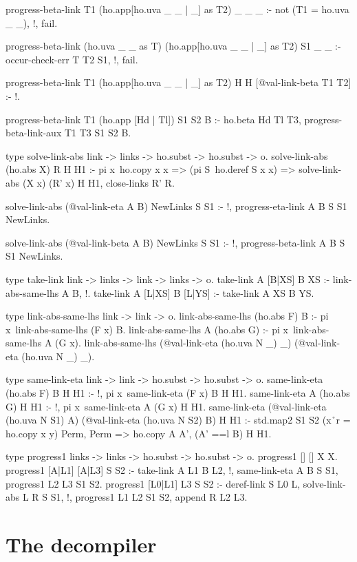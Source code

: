 \begin{elpicode}
  progress-beta-link T1 (ho.app[ho.uva _ _ | _] as T2) _ _ _ :- 
    not (T1 = ho.uva _ _), !, fail.

  progress-beta-link (ho.uva _ _ as T) (ho.app[ho.uva _ _ | _] as T2) S1 _ _ :- 
    occur-check-err T T2 S1, !, fail.

  progress-beta-link T1 (ho.app[ho.uva _ _ | _] as T2) H H [@val-link-beta T1 T2] :- !.

  progress-beta-link T1 (ho.app [Hd | Tl]) S1 S2 B :-
    ho.beta Hd Tl T3, 
    progress-beta-link-aux T1 T3 S1 S2 B.

  type solve-link-abs link -> links -> ho.subst -> ho.subst -> o.
  solve-link-abs (ho.abs X) R H H1 :- 
    pi x\ ho.copy x x => (pi S\ ho.deref S x x) => 
      solve-link-abs (X x) (R' x) H H1,
    close-links R' R.

  solve-link-abs (@val-link-eta A B) NewLinks S S1 :- !,
    progress-eta-link A B S S1 NewLinks.

  solve-link-abs (@val-link-beta A B) NewLinks S S1 :- !,
    progress-beta-link A B S S1 NewLinks.

  type take-link link -> links -> link -> links -> o.
  take-link A [B|XS] B XS :- link-abs-same-lhs A B, !.
  take-link A [L|XS] B [L|YS] :- take-link A XS B YS.

  type link-abs-same-lhs link -> link -> o.
  link-abs-same-lhs (ho.abs F) B :- 
    pi x\ link-abs-same-lhs (F x) B.
  link-abs-same-lhs A (ho.abs G) :- 
    pi x\ link-abs-same-lhs A (G x).
  link-abs-same-lhs (@val-link-eta (ho.uva N _) _) (@val-link-eta (ho.uva N _) _).

  type same-link-eta link -> link -> ho.subst -> ho.subst -> o.
  same-link-eta (ho.abs F) B H H1 :- !, pi x\ same-link-eta (F x) B H H1.
  same-link-eta A (ho.abs G) H H1 :- !, pi x\ same-link-eta A (G x) H H1.
  same-link-eta (@val-link-eta (ho.uva N S1) A)
                (@val-link-eta (ho.uva N S2) B) H H1 :-
    std.map2 S1 S2 (x\y\r\ r = ho.copy x y) Perm,
    Perm => ho.copy A A',
    (A' ==l B) H H1.

  type progress1 links -> links -> ho.subst -> ho.subst -> o.
  progress1 [] [] X X.
  progress1 [A|L1] [A|L3] S S2 :- take-link A L1 B L2, !,
    same-link-eta A B S S1, 
    progress1 L2 L3 S1 S2.
  progress1 [L0|L1] L3 S S2 :- deref-link S L0 L,
    solve-link-abs L R S S1, !,
    progress1 L1 L2 S1 S2, append R L2 L3.
\end{elpicode}

\section{The decompiler}

